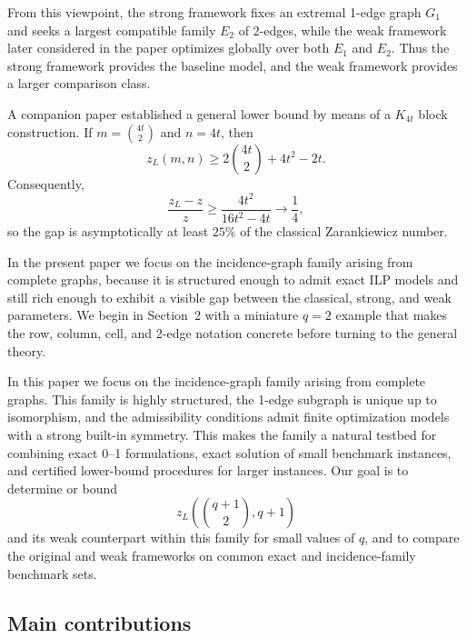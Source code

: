 \documentclass[10pt]{article}
\newcommand{\0}{\mathbf{0}}
\newcommand{\1}{\mathbf{1}}
\begin{document}
{From this viewpoint, the strong framework fixes an extremal 1-edge graph \(G_1\) and seeks a largest compatible family \(E_2\) of 2-edges, while the weak framework later considered in the paper optimizes globally over both \(E_1\) and \(E_2\). Thus the strong framework provides the baseline model, and the weak framework provides a larger comparison class.}

A companion paper \cite{QCX26b} established a general lower bound by means of a \(K_{4t}\) block construction. If \(m=\binom{4t}{2}\) and \(n=4t\), then
\[
z_L(m,n)\ge 2\binom{4t}{2}+4t^2-2t.
\]
Consequently,
\[
\frac{z_L-z}{z}\ge \frac{4t^2}{16t^2-4t}\longrightarrow \frac14,
\]
so the gap is asymptotically at least \(25\%\) of the classical Zarankiewicz number.

{In the present paper we focus on the incidence-graph family arising from complete graphs, because it is structured enough to admit exact ILP models and still rich enough to exhibit a visible gap between the classical, strong, and weak parameters. We begin in Section~2 with a miniature \(q=2\) example that makes the row, column, cell, and 2-edge notation concrete before turning to the general theory.}

In this paper we focus on the incidence-graph family arising from complete graphs. This family is highly structured, the 1-edge subgraph is unique up to isomorphism, and the admissibility conditions admit finite optimization models with a strong built-in symmetry. This makes the family a natural testbed for combining exact 0--1 formulations, exact solution of small benchmark instances, and certified lower-bound procedures for larger instances. Our goal is to determine or bound
\[
z_L\!\left(\binom{q+1}{2},q+1\right)
\]
and its weak counterpart within this family for small values of \(q\), and to compare the original and weak frameworks on common exact and incidence-family benchmark sets.

\subsection*{Main contributions}
\end{document}
